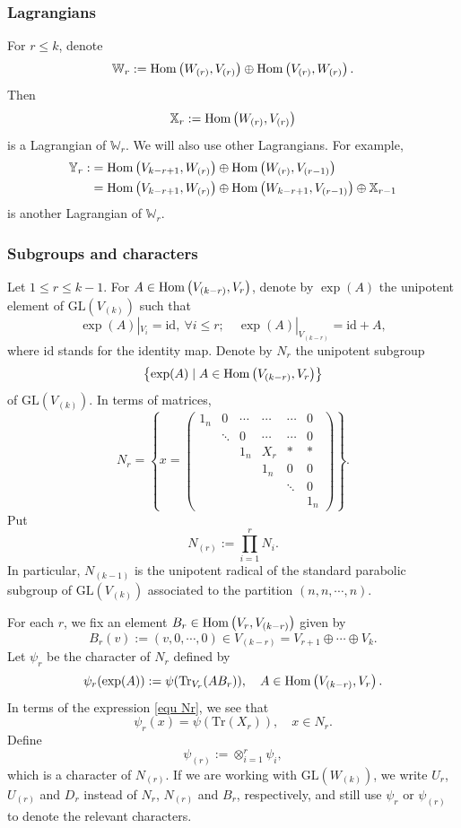 \documentclass[11pt,reqno]{amsart}
\renewcommand{\1}{{\mathbf{1}}} \newcommand{\sB}{{\mathscr{B}}}
\newcommand{\BW}{{\mathbb {W}}} \newcommand{\BX}{{\mathbb {X}}}
\newcommand{\BY}{{\mathbb {Y}}} \newcommand{\BZ}{{\mathbb {Z}}}
\newcommand{\GL}{{\mathrm{GL}}}\newcommand{\G}{{\mathrm{G}}}
\newcommand{\id}{{\mathrm{id}}}\renewcommand{\Im}{{\mathrm{Im}}}
\newcommand{\Tr}{{\mathrm{Tr}}}
\theoremstyle{plain}
\theoremstyle{definition}
\numberwithin{equation}{section}
\begin{document}
\subsubsection{Lagrangians}
For $r\leq k$, denote $$\BW_r:=\Hom\left(W_{(r)},V_{(r)}\right)\oplus\Hom\left(V_{(r)},W_{(r)}\right).$$ 
Then $$\BX_{r}:=\Hom\left(W_{(r)},V_{(r)}\right)$$ 
is a Lagrangian of $\BW_{r}$. We will also use other Lagrangians. For example,
$$\begin{aligned}\BY_r:&=\Hom\left(V_{k-r+1},W_{(r)}\right)\oplus\Hom\left(W_{(r)},V_{(r-1)}\right)\\
&=\Hom\left(V_{k-r+1},W_{(r)}\right)\oplus\Hom\left(W_{k-r+1},V_{(r-1)}\right)\oplus\BX_{r-1}
\end{aligned}$$ is another Lagrangian of $\BW_{r}$. 


 

\subsubsection{Subgroups and characters} 
Let $1\leq r\leq k-1$. For $A\in{\mathrm{Hom}}\left(V_{(k-r)},V_r\right)$, denote by $\exp(A)$ the unipotent element of $\GL(V_{(k)})$ such that $$\exp(A)|_{V_i}=\id,\ \forall i\leq r;\quad\exp(A)|_{V_{(k-r)}}=\id+A,$$ where $\id$ stands for the identity map.  Denote by $N_r$ the unipotent subgroup 
$$\left\{\exp(A)\mid A\in{\mathrm{Hom}}\left(V_{(k-r)},V_r\right)\right\}$$ of $\GL(V_{(k)})$. In terms of matrices, 
\begin{equation}\label{equ Nr}N_r=\left\{x=\begin{pmatrix}1_n&0&\cdots&\cdots&\cdots&0\\ &\ddots&0&\cdots&\cdots&0\\ &&1_n&X_r&*&*\\
&&&1_n&0&0\\ &&&&\ddots&0\\ &&&&&1_n \end{pmatrix}\right\}.\end{equation}
Put $$N_{(r)}:=\prod_{i=1}^rN_i.$$ In particular, $N_{(k-1)}$ is the unipotent radical of the standard parabolic subgroup of $\GL(V_{(k)})$ associated to the partition $(n,n,\cdots,n)$.

For each $r$, we fix an element $B_r\in{\mathrm{Hom}}\left(V_r,V_{(k-r)}\right)$ given by $$B_r(v):=(v,0,\cdots,0)\in V_{(k-r)}=V_{r+1}\oplus\cdots\oplus V_k.$$ Let $\psi_r$ be the character of $N_r$ defined by $$\psi_r(\exp(A)):=\psi(\Tr_{V_r}(AB_r)),\quad A\in\Hom\left(V_{(k-r)},V_r\right).$$
In terms of the expression \eqref{equ Nr}, we see that
$$\psi_r(x)=\psi(\Tr(X_{r})),\quad x\in N_r.$$ Define
$$\psi_{(r)}:=\otimes_{i=1}^r\psi_i,$$ which is a character of $N_{(r)}$.
If we are working with $\GL(W_{(k)})$, we write $U_r$, $U_{(r)}$ and $D_r$ instead of $N_r$, $N_{(r)}$ and $B_r$, respectively, and still use $\psi_r$ or $\psi_{(r)}$ to denote the relevant characters. 
\end{document}
